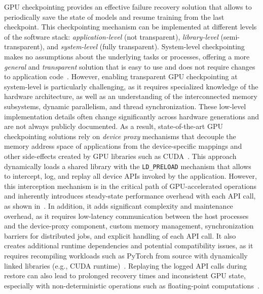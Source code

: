 GPU checkpointing provides an effective failure recovery solution that allows to periodically save the state of models and resume training from the last checkpoint. This checkpointing mechanism can be implemented at different levels of the software stack: \textit{application-level} (not transparent), \textit{library-level} (semi-transparent), and \textit{system-level} (fully transparent). System-level checkpointing makes no assumptions about the underlying tasks or processes, offering a more \textit{general} and \textit{transparent} solution that is easy to use and does not require changes to application code~\cite{chaudhary2020balancing,shukla2022singularity,gupta2024just}. However, enabling transparent GPU checkpointing at system-level is particularly challenging, as it requires specialized knowledge of the hardware architecture, as well as an understanding of the interconnected memory subsystems, dynamic parallelism, and thread synchronization. These low-level implementation details often change significantly across hardware generations and are not always publicly documented. As a result, state-of-the-art GPU checkpointing solutions rely on \textit{device proxy} mechanisms that decouple the memory address space of applications from the device-specific mappings and other side-effects created by GPU libraries such as CUDA~\cite{jain2020crac, shukla2022singularity,eiling2023checkpoint}. This approach dynamically loads a shared library with the \texttt{LD\_PRELOAD} mechanism that allows to intercept, log, and replay all device APIs invoked by the application. However, this interception mechanism is in the critical path of GPU-accelerated operations and inherently introduces steady-state performance overhead with each API call, as shown in~. In addition, it adds significant complexity and maintenance overhead, as it requires low-latency communication between the host processes and the device-proxy component, custom memory management, synchronization barriers for distributed jobs, and explicit handling of each API call. It also creates additional runtime dependencies and potential compatibility issues, as it requires recompiling workloads such as PyTorch from source with dynamically linked libraries (e.g., CUDA runtime)~\cite{eiling2023cricket}. Replaying the logged API calls during restore can also lead to prolonged recovery times and inconsistent GPU state, especially with non-deterministic operations such as floating-point computations~\cite{riachnvidia2019gtc}.

